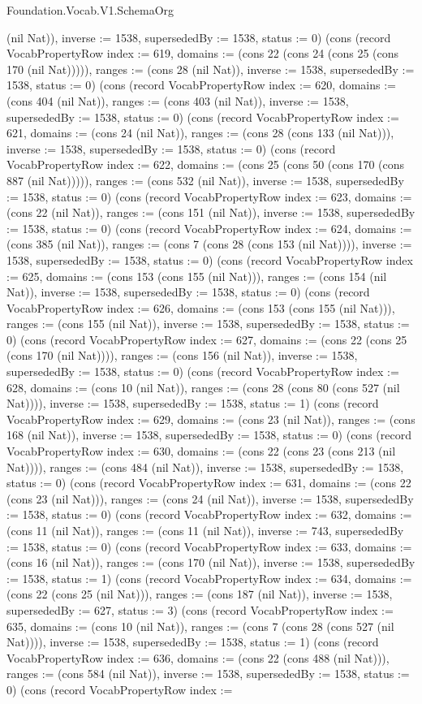 \begin{lexlean}{Foundation.Vocab.V1.SchemaOrg}
\begin{semanticmodule}
{(nil Nat)), inverse := 1538, supersededBy := 1538, status := 0}) (cons (record VocabPropertyRow {index := 619, domains := (cons 22 (cons 24 (cons 25 (cons 170 (nil Nat))))), ranges := (cons 28 (nil Nat)), inverse := 1538, supersededBy := 1538, status := 0}) (cons (record VocabPropertyRow {index := 620, domains := (cons 404 (nil Nat)), ranges := (cons 403 (nil Nat)), inverse := 1538, supersededBy := 1538, status := 0}) (cons (record VocabPropertyRow {index := 621, domains := (cons 24 (nil Nat)), ranges := (cons 28 (cons 133 (nil Nat))), inverse := 1538, supersededBy := 1538, status := 0}) (cons (record VocabPropertyRow {index := 622, domains := (cons 25 (cons 50 (cons 170 (cons 887 (nil Nat))))), ranges := (cons 532 (nil Nat)), inverse := 1538, supersededBy := 1538, status := 0}) (cons (record VocabPropertyRow {index := 623, domains := (cons 22 (nil Nat)), ranges := (cons 151 (nil Nat)), inverse := 1538, supersededBy := 1538, status := 0}) (cons (record VocabPropertyRow {index := 624, domains := (cons 385 (nil Nat)), ranges := (cons 7 (cons 28 (cons 153 (nil Nat)))), inverse := 1538, supersededBy := 1538, status := 0}) (cons (record VocabPropertyRow {index := 625, domains := (cons 153 (cons 155 (nil Nat))), ranges := (cons 154 (nil Nat)), inverse := 1538, supersededBy := 1538, status := 0}) (cons (record VocabPropertyRow {index := 626, domains := (cons 153 (cons 155 (nil Nat))), ranges := (cons 155 (nil Nat)), inverse := 1538, supersededBy := 1538, status := 0}) (cons (record VocabPropertyRow {index := 627, domains := (cons 22 (cons 25 (cons 170 (nil Nat)))), ranges := (cons 156 (nil Nat)), inverse := 1538, supersededBy := 1538, status := 0}) (cons (record VocabPropertyRow {index := 628, domains := (cons 10 (nil Nat)), ranges := (cons 28 (cons 80 (cons 527 (nil Nat)))), inverse := 1538, supersededBy := 1538, status := 1}) (cons (record VocabPropertyRow {index := 629, domains := (cons 23 (nil Nat)), ranges := (cons 168 (nil Nat)), inverse := 1538, supersededBy := 1538, status := 0}) (cons (record VocabPropertyRow {index := 630, domains := (cons 22 (cons 23 (cons 213 (nil Nat)))), ranges := (cons 484 (nil Nat)), inverse := 1538, supersededBy := 1538, status := 0}) (cons (record VocabPropertyRow {index := 631, domains := (cons 22 (cons 23 (nil Nat))), ranges := (cons 24 (nil Nat)), inverse := 1538, supersededBy := 1538, status := 0}) (cons (record VocabPropertyRow {index := 632, domains := (cons 11 (nil Nat)), ranges := (cons 11 (nil Nat)), inverse := 743, supersededBy := 1538, status := 0}) (cons (record VocabPropertyRow {index := 633, domains := (cons 16 (nil Nat)), ranges := (cons 170 (nil Nat)), inverse := 1538, supersededBy := 1538, status := 1}) (cons (record VocabPropertyRow {index := 634, domains := (cons 22 (cons 25 (nil Nat))), ranges := (cons 187 (nil Nat)), inverse := 1538, supersededBy := 627, status := 3}) (cons (record VocabPropertyRow {index := 635, domains := (cons 10 (nil Nat)), ranges := (cons 7 (cons 28 (cons 527 (nil Nat)))), inverse := 1538, supersededBy := 1538, status := 1}) (cons (record VocabPropertyRow {index := 636, domains := (cons 22 (cons 488 (nil Nat))), ranges := (cons 584 (nil Nat)), inverse := 1538, supersededBy := 1538, status := 0}) (cons (record VocabPropertyRow {index := }
\end{semanticmodule}
\end{lexlean}
